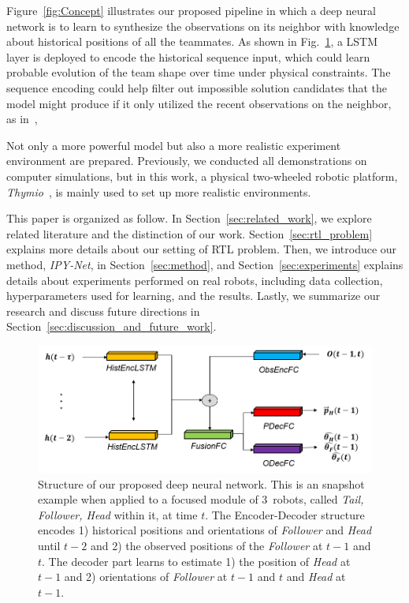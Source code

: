 \documentclass[letterpaper, 10 pt, conference]{ieeeconf}  %
\begin{document}
	Figure~\ref{fig:Concept} illustrates our proposed pipeline in which
	a deep neural network is to learn to synthesize the observations on its neighbor
	with knowledge about historical positions of all the teammates.
	As shown in Fig.~\ref{fig:DL_Pipeline}, a LSTM layer is deployed to encode
	the historical sequence input, which could learn probable evolution of the
	team shape over time under physical constraints.
	The sequence encoding could help filter out impossible solution candidates
	that the model might produce if it only utilized the recent observations on
	the neighbor, as in~\cite{CPR17},

	Not only a more powerful model but also a more realistic experiment
	environment are prepared. Previously, we
	conducted all demonstrations on computer simulations, but in this work,
	a physical two-wheeled robotic platform, \emph{Thymio}~\cite{Shin14}, is mainly
	used to set up more realistic environments.


	This paper is organized as follow.
	In Section~\ref{sec:related_work}, we explore related literature and the distinction of our work.
	Section~\ref{sec:rtl_problem} explains more details about our setting of RTL problem.
	Then, we introduce our method, \emph{IPY-Net}, in Section~\ref{sec:method}, and
	Section~\ref{sec:experiments} explains details about experiments performed on real robots,
	including data collection, hyperparameters used for learning, and the results.
	Lastly, we summarize our research and discuss future directions
	in Section~\ref{sec:discussion_and_future_work}.

	\begin{figure}\centering
		\includegraphics[width=1.\columnwidth]{fig_DL_Pipeline}
		\caption{Structure of our proposed deep neural network.
			This is an snapshot example when applied to a focused module of
			$3$~robots, called \emph{Tail, Follower, Head} within it, at time $t$.
			The Encoder-Decoder structure encodes
			1) historical positions and orientations of \emph{Follower} and \emph{Head}
			until $t-2$ and 2) the observed positions of the \emph{Follower} at $t-1$ and $t$.
			The decoder part learns to estimate 1) the position of \emph{Head} at $t-1$ and
			2) orientations of \emph{Follower} at $t-1$ and $t$ and \emph{Head} at $t-1$.
		}
		\label{fig:DL_Pipeline}
	\end{figure}
\end{document}
